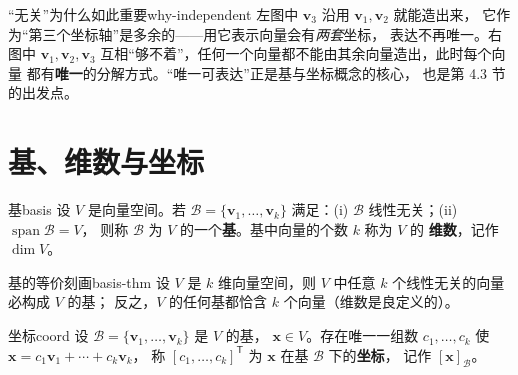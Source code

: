 \documentclass[11pt,a4paper,openany]{ctexbook}
\DeclareMathOperator{\Span}{span}
\begin{document}
\begin{remk}{“无关”为什么如此重要}{why-independent}
左图中 $\boldsymbol{v}_3$ 沿用 $\boldsymbol{v}_1,\boldsymbol{v}_2$ 就能造出来，
它作为“第三个坐标轴”是多余的——用它表示向量会有\emph{两套}坐标，
表达不再唯一。右图中 $\boldsymbol{v}_1,\boldsymbol{v}_2,\boldsymbol{v}_3$
互相“够不着”，任何一个向量都不能由其余向量造出，此时每个向量
都有\textbf{唯一}的分解方式。“唯一可表达”正是基与坐标概念的核心，
也是第 4.3 节的出发点。
\end{remk}

\section{基、维数与坐标}

\begin{defn}{基}{basis}
设 $V$ 是向量空间。若 $\mathcal{B}=\{\boldsymbol{v}_1,\dots,\boldsymbol{v}_k\}$
满足：(i) $\mathcal{B}$ 线性无关；(ii) $\Span\mathcal{B}=V$，
则称 $\mathcal{B}$ 为 $V$ 的一个\textbf{基}。基中向量的个数 $k$ 称为 $V$ 的
\textbf{维数}，记作 $\dim V$。
\end{defn}

\begin{thm}{基的等价刻画}{basis-thm}
设 $V$ 是 $k$ 维向量空间，则 $V$ 中任意 $k$ 个线性无关的向量必构成 $V$ 的基；
反之，$V$ 的任何基都恰含 $k$ 个向量（维数是良定义的）。
\end{thm}

\begin{defn}{坐标}{coord}
设 $\mathcal{B}=\{\boldsymbol{v}_1,\dots,\boldsymbol{v}_k\}$ 是 $V$ 的基，
$\boldsymbol{x}\in V$。存在唯一一组数 $c_1,\dots,c_k$ 使
$\boldsymbol{x}=c_1\boldsymbol{v}_1+\cdots+c_k\boldsymbol{v}_k$，
称 $[c_1,\dots,c_k]^{\mathsf T}$ 为 $\boldsymbol{x}$ 在基 $\mathcal{B}$ 下的\textbf{坐标}，
记作 $[\boldsymbol{x}]_{\mathcal{B}}$。
\end{defn}
\end{document}
